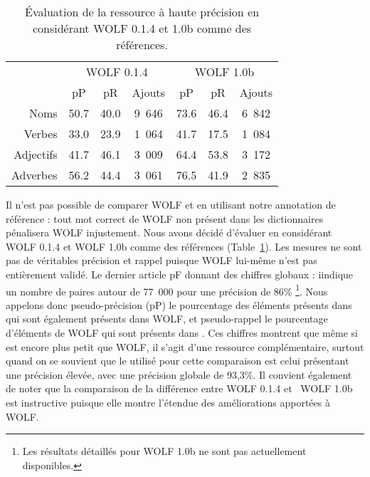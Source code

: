\begin{table}[ht]
\centering
\begin{tabular}{rccc|ccc}
  \toprule
             & \multicolumn{3}{c}{WOLF 0.1.4}    & \multicolumn{3}{c}{WOLF 1.0b} \\
             &   pP      &    pR     & Ajouts    &     pP    &    pR    & Ajouts \\
  Noms       & 50.7     & 40.0     & 9~646     & 73.6     & 46.4    & 6~842  \\
  Verbes     & 33.0     & 23.9     & 1~064     & 41.7     & 17.5    & 1~084  \\
  Adjectifs  & 41.7     & 46.1     & 3~009     & 64.4     & 53.8    & 3~172  \\
  Adverbes   & 56.2     & 44.4     & 3~061     & 76.5     & 41.9    & 2~835  \\ 
  \bottomrule
\end{tabular}
\caption{\protect\centering\label{table:wolfcomparison}Évaluation de la ressource à haute précision en considérant WOLF 0.1.4 et 1.0b comme des références.}
\end{table}


Il n'est pas possible de comparer WOLF et \newjaws{} en utilisant notre annotation de référence : tout mot correct de WOLF non présent dans les dictionnaires pénalisera WOLF injustement. Nous avons décidé d'évaluer \newjaws{} en considérant WOLF 0.1.4 et WOLF 1.0b comme des références (Table~\ref{table:wolfcomparison}). Les mesures ne sont pas de véritables précision et rappel puisque WOLF lui-même n'est pas entièrement validé. Le dernier article pF donnant des chiffres globaux \citep{sagot-fiser-igwc2012} : iindique un nombre de paires autour de 77~000 pour une précision de 86\% \footnote{Les résultats détaillés pour WOLF 1.0b ne sont pas actuellement disponibles.}. Nous appelons donc pseudo-précision (pP) le pourcentage des éléments présents dans \newjaws{} qui sont également présents dans WOLF, et pseudo-rappel le pourcentage d'éléments de WOLF qui sont présents dans \newjaws{}. Ces chiffres montrent que même si \newjaws{} est encore plus petit que WOLF, il s'agit d'une ressource complémentaire, surtout quand on se souvient que le \newjaws{} utilisé pour cette comparaison est celui présentant une précision élevée, avec une précision globale de 93,3\%. Il convient également de noter que la comparaison de la différence entre WOLF 0.1.4 et \ WOLF 1.0b est instructive puisque elle montre l'étendue des améliorations apportées à WOLF.

